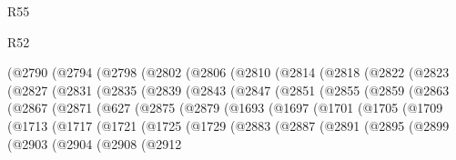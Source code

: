 \begin{lexlean}{R55}
\begin{lexlean}{R52}
\begin{coremodule}
{{{{{{{{{{{{{{{{{{{{{{{{{{{{{{{{{{{{{{{{{{{{{{{{{{{{{{{{{{{{{{{{{{{{{{{{{{{{{{{{{{{{{{{{{{{{{{{{{{{{{{{{{{{{{{{{{{{{{{{{{{{{{{{{{{{{{{{{{{{{{{{{{{{{{{{{{{{{{{{{{{{{{{{{{{{{{{{{{{{{{{{{{{{{{{{{{{{{{{          (@2790
            (@2794
              (@2798
                (@2802
                  (@2806
                    (@2810
                      (@2814
                        (@2818
                          (@2822
                            (@2823
                              (@2827
                                (@2831
                                  (@2835
                                    (@2839
                                      (@2843
                                        (@2847
                                          (@2851
                                            (@2855
                                              (@2859
                                                (@2863
                                                  (@2867
                                                    (@2871
                                                      (@627
                                                        (@2875
                                                          (@2879
                                                            (@1693
                                                              (@1697
                                                                (@1701
                                                                  (@1705
                                                                    (@1709
                                                                      (@1713
                                                                        (@1717
                                                                          (@1721
                                                                            (@1725
                                                                              (@1729
                                                                                (@2883
                                                                                  (@2887
                                                                                    (@2891
                                                                                      (@2895
                                                                                        (@2899
                                                                                          (@2903
                                                                                            (@2904
                                                                                              (@2908
                                                                                                (@2912
}}}}}}}}}}}}}}}}}}}}}}}}}}}}}}}}}}}}}}}}}}}}}}}}}}}}}}}}}}}}}}}}}}}}}}}}}}}}}}}}}}}}}}}}}}}}}}}}}}}}}}}}}}}}}}}}}}}}}}}}}}}}}}}}}}}}}}}}}}}}}}}}}}}}}}}}}}}}}}}}}}}}}}}}}}}}}}}}}}}}}}}}}}}}}}}}}}}}}}
\end{coremodule}
\end{lexlean}
\end{lexlean}

